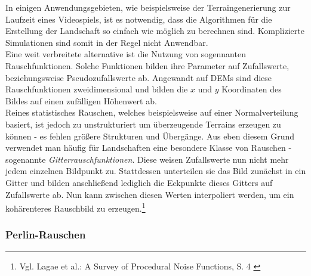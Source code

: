 In einigen Anwendungsgebieten, wie beispielsweise der Terraingenerierung zur Laufzeit eines Videospiels, ist es notwendig, dass die Algorithmen für die Erstellung der Landschaft so einfach wie möglich zu berechnen sind. Komplizierte Simulationen sind somit in der Regel nicht Anwendbar. \\ 
Eine weit verbreitete alternative ist die Nutzung von sogennanten Rauschfunktionen. Solche Funktionen bilden ihre Parameter auf Zufallswerte, beziehungsweise Pseudozufallswerte ab. Angewandt auf \ac{DEM}s sind diese Rauschfunktionen zweidimensional und bilden die $x$ und $y$ Koordinaten des Bildes auf einen zufälligen Höhenwert ab. \\ 
Reines statistisches Rauschen, welches beispielsweise auf einer Normalverteilung basiert, ist jedoch zu unstrukturiert um überzeugende Terrains erzeugen zu können - es fehlen größere Strukturen und Übergänge. Aus eben diesem Grund verwendet man häufig für Landschaften eine besondere Klasse von Rauschen - sogenannte \textit{Gitterrauschfunktionen}. Diese weisen Zufallswerte nun nicht mehr jedem einzelnen Bildpunkt zu. Stattdessen unterteilen sie das Bild zunächst in ein Gitter und bilden anschließend lediglich die Eckpunkte dieses Gitters auf Zufallswerte ab. Nun kann zwischen diesen Werten interpoliert werden, um ein kohärenteres Rauschbild zu erzeugen.\footnote{
    Vgl. Lagae et al.: A Survey of Procedural Noise Functions, S. 4
    \cite{https://doi.org/10.1111/j.1467-8659.2010.01827.x}
}  

\subsubsection{Perlin-Rauschen}

